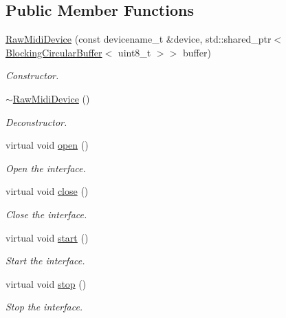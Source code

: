 \subsection*{Public Member Functions}
\begin{DoxyCompactItemize}
\item 
\hyperlink{group__Midi_ga5ad811af40ee0c2b2c97f63bd9d6163b}{Raw\+Midi\+Device} (const devicename\+\_\+t \&device, std\+::shared\+\_\+ptr$<$ \hyperlink{classNl_1_1BlockingCircularBuffer}{Blocking\+Circular\+Buffer}$<$ uint8\+\_\+t $>$$>$ buffer)
\begin{DoxyCompactList}\small\item\em Constructor. \end{DoxyCompactList}\item 
\hyperlink{group__Midi_ga8ede83b60ff88f34a597952ea1bd32fb}{$\sim$\+Raw\+Midi\+Device} ()
\begin{DoxyCompactList}\small\item\em Deconstructor. \end{DoxyCompactList}\item 
virtual void \hyperlink{group__Midi_gace91f1137effd037eca8b3b959508f91}{open} ()
\begin{DoxyCompactList}\small\item\em Open the interface. \end{DoxyCompactList}\item 
virtual void \hyperlink{group__Midi_gaa66489de15df30f282637b8a1bcd263d}{close} ()
\begin{DoxyCompactList}\small\item\em Close the interface. \end{DoxyCompactList}\item 
virtual void \hyperlink{group__Midi_ga9ca4e486b5df388d9000ea8ef48d31a8}{start} ()
\begin{DoxyCompactList}\small\item\em Start the interface. \end{DoxyCompactList}\item 
virtual void \hyperlink{group__Midi_gae95fcc2ce4b3681d34f341b2d5c9276e}{stop} ()
\begin{DoxyCompactList}\small\item\em Stop the interface. \end{DoxyCompactList}\end{DoxyCompactItemize}
